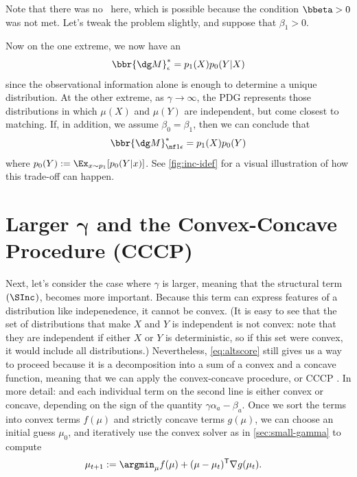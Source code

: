 \begin{example}
Note that there was no \obslimit\ here, which is possible 
because the condition $\bbeta > 0$ was not met.  Let's tweak the problem slightly, 
and suppose that $\beta_1 > 0$.

Now on the one extreme, we now have an \obslimit\
\[
    \bbr{\dg M}^*_{\epsilon} = p_1(X) p_0(Y|X)
\]
since the observational information alone is enough to determine a unique distribution.
At the other extreme, as $\gamma \to \infty$, the PDG represents those distributions 
in which $\mu(X)$ and $\mu(Y)$ are independent, but come closest to matching.
If, in addition, we assume $\beta_0 = \beta_1$, then we can conclude that
\[
    \bbr{\dg M}^*_{\nf1\epsilon} = p_1(X) p_0(Y) 
\]
where $p_0(Y) := \Ex_{x \sim p_1}[ p_0(Y|x) ]$.
See \cref{fig:inc-idef} for a visual illustration of how this trade-off can happen.
\end{example}


\section{Larger
    \texorpdfstring{$\boldsymbol\gamma$}{Gamma} and the Convex-Concave Procedure (CCCP)}
    \label{sec:larger-gamma}

Next, let's consider the case where $\gamma$ is
larger, meaning that the structural term $(\SInc_{})$,
becomes more important.
Because 
this term can express features of a distribution like indepenedence, it cannot be convex. 
(It is easy to see that the set of distributions that make $X$ and $Y$ is independent is not convex: note that they are independent if either $X$ or $Y$ is deterministic, so if this set were convex, it would include all distributions.)
Nevertheless, \eqref{eq:altscore} still gives us a way to proceed because it is a decomposition into a sum of a convex and a concave function, meaning that we can apply the convex-concave procedure, or CCCP \parencite{yuille2003concave}.
In more detail: and each individual term on the second line is either convex or concave, depending on the sign of the quantity $\gamma \alpha_a - \beta_a$.
Once we sort the terms into convex terms $f(\mu)$ and strictly concave terms $g(\mu)$, we can choose an initial guess $\mu_0$, and iteratively use the convex solver as in \cref{sec:small-gamma} to compute
%
\begin{align*}
    \mu_{t+1} &:= \argmin_{\mu} f(\mu) + (\mu - \mu_{t})^{\sf T}
        \nabla g(\mu_t).
\end{align*}

